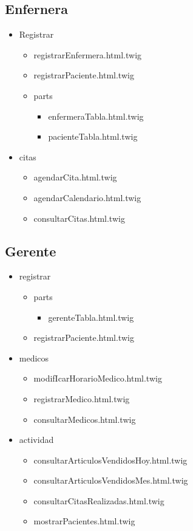 		\subsection{Enfernera}
		\begin{itemize}
		\item Registrar
		\begin{itemize}
		\item registrarEnfermera.html.twig
		\item registrarPaciente.html.twig
		\item parts
			\begin{itemize}
				\item enfermeraTabla.html.twig
				\item pacienteTabla.html.twig
			\end{itemize}
		\end{itemize}
		\item citas 
			\begin{itemize}
				\item agendarCita.html.twig
				\item agendarCalendario.html.twig
				\item consultarCitas.html.twig
			\end{itemize}
		\end{itemize}
		
		\subsection{Gerente}
		\begin{itemize}
			\item registrar
			\begin{itemize}
				\item parts 
				\begin{itemize}
				\item gerenteTabla.html.twig
				\end{itemize}
				\item registrarPaciente.html.twig
			\end{itemize}
			\item medicos 
			\begin{itemize}
			\item modifIcarHorarioMedico.html.twig
			\item registrarMedico.html.twig
			\item consultarMedicos.html.twig
			\end{itemize}
			\item actividad
			\begin{itemize}
				\item consultarArticulosVendidosHoy.html.twig
				\item consultarArticulosVendidosMes.html.twig
				\item consultarCitasRealizadas.html.twig
				\item mostrarPacientes.html.twig
			\end{itemize}
		\end{itemize}
		
